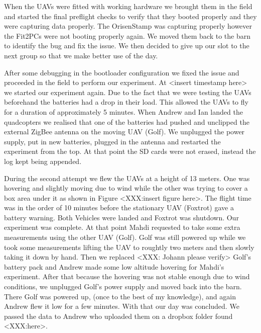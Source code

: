 When the UAVs were fitted with working hardware we brought them in the field and
started the final preflight checks to verify that they booted properly and they
were capturing data properly. The OrisenStamp was capturing properly however the
Fit2PCs were not booting properly again. We moved them back to the barn to
identify the bug and fix the issue. We then decided to give up our slot to the
next group so that we make better use of the day.

After some debugging in the bootloader configuration we fixed the issue and
proceeded in the field to perform our experiment. At <insert timestamp here> we
started our experiment again. Due to the fact that we were testing the UAVs
beforehand the batteries had a drop in their load. This allowed the UAVs to
fly for a duration of approximately 5 minutes. When Andrew and Ian landed
the quadcopters we realised that one of the batteries had pushed and unclipped
the external ZigBee antenna on the moving UAV (Golf). We unplugged the power
supply, put in new batteries, plugged in the antenna and restarted the
experiment from the top. At that point the SD cards were not erased, instead the
log kept being appended.

During the second attempt we flew the UAVs at a height of 13 meters. One was
hovering and slightly moving due to wind while the other was trying to cover a
box area under it as shown in Figure <XXX:insert figure here>. The flight time
was in the order of 10 minutes before the stationary UAV (Foxtrot) gave a
battery warning. Both Vehicles were landed and Foxtrot was shutdown. Our
experiment was complete. At that point Mahdi requested to take some extra
measurements using the other UAV (Golf). Golf was still powered up while we took
some measurements lifting the UAV to roughtly two meters and then slowly taking
it down by hand. Then we replaced <XXX: Johann please verify> Golf's battery
pack and Andrew made some low altitude hovering for Mahdi's experiment. After
that because the hovering was not stable enough due to wind conditions, we
unplugged Golf's power supply and moved back into the barn. There Golf was
powered up, (once to the best of my knowledge), and again Andrew flew it low for
a few minutes. With that our day was concluded. We passed the data to Andrew
who uploaded them on a dropbox folder found <XXX:here>.


